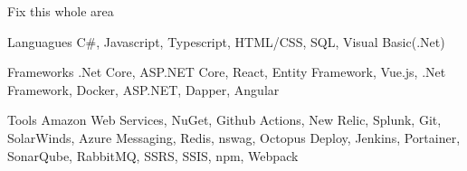


\begin{cvskills}
	\cvskill
	{Fix this whole area} %
	{} %
	
	\cvskill
	    {Languagues} %
		{C\#, Javascript, Typescript, HTML/CSS, SQL, Visual Basic(.Net)} %

	\cvskill
		{Frameworks} %
		{.Net Core, ASP.NET Core, React, Entity Framework, Vue.js, .Net Framework, Docker, ASP.NET, Dapper, Angular} %
		
	\cvskill
		{Tools} %
		{Amazon Web Services, NuGet, Github Actions, New Relic, Splunk, Git, SolarWinds, Azure Messaging, Redis, nswag, Octopus Deploy, Jenkins, Portainer, SonarQube, RabbitMQ, SSRS, SSIS, npm, Webpack} %
\end{cvskills}



